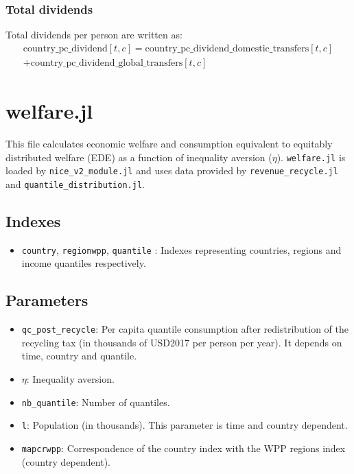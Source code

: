 \documentclass[
]{article}
\providecommand{\tightlist}{%
  \setlength{\itemsep}{0pt}\setlength{\parskip}{0pt}}
\begin{document}
\subsubsection{Total dividends}\label{total-dividends}

Total dividends per person are written as:
\begin{multline}
 \text{country\_pc\_dividend}[t,c] = \text{country\_pc\_dividend\_domestic\_transfers}[t,c] \\ 
 + \text{country\_pc\_dividend\_global\_transfers}[t,c]
\end{multline}


\section{welfare.jl}\label{welfare.jl}

This file calculates economic welfare and consumption equivalent to
equitably distributed welfare (EDE) as a function of inequality aversion
(\(\eta\)). \texttt{welfare.jl} is loaded by
\texttt{nice\_v2\_module.jl} and uses data provided by
\texttt{revenue\_recycle.jl} and \texttt{quantile\_distribution.jl}.

\subsection{Indexes}\label{indexes-4}

\begin{itemize}
\tightlist
\item
  \texttt{country}, \texttt{regionwpp}, \texttt{quantile} : Indexes
  representing countries, regions and income quantiles respectively.
\end{itemize}

\subsection{Parameters}\label{parameters-7}

\begin{itemize}
\tightlist
\item
  \texttt{qc\_post\_recycle}: Per capita quantile consumption after
  redistribution of the recycling tax (in thousands of USD2017 per
  person per year). It depends on time, country and quantile.
\item
  \(\eta\): Inequality aversion.
\item
  \texttt{nb\_quantile}: Number of quantiles.
\item
  \texttt{l}: Population (in thousands). This parameter is time and country dependent.
\item
  \texttt{mapcrwpp}: Correspondence of the country index with the WPP
  regions index (country dependent).
\end{itemize}
\end{document}
